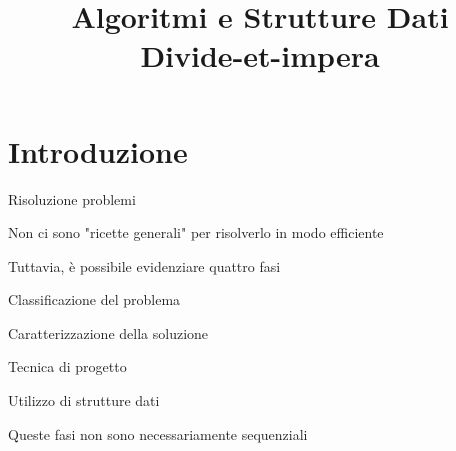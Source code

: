 
\title[ASD - Divide-et-impera]{\textbf{Algoritmi e Strutture Dati}\\[24pt]Divide-et-impera}

\renewcommand{\Primo}{\mathit{lo}\xspace}
\renewcommand{\Ultimo}{\mathit{hi}\xspace}

\usepackage{tikz}
\usepackage{xmpmulti}
\usepackage{listings}


\graphicspath{{figs/12/}}



\FrameTitle{}

\FrameContent



\section{Introduzione}



\begin{frame}{Risoluzione problemi}

\vspace{-9pt}
\BIL
\item Non ci sono "ricette generali" per risolverlo in modo efficiente
\item Tuttavia, è possibile evidenziare quattro fasi
\BI
\item \alert{Classificazione del problema}
\item \alert{Caratterizzazione della soluzione}
\item \alert{Tecnica di progetto}
\item \alert{Utilizzo di strutture dati}
\EI
\item Queste fasi non sono necessariamente sequenziali
\EIL

\end{frame}


